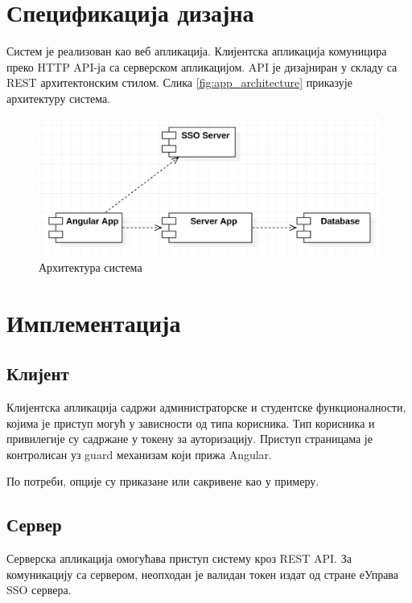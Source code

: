 \documentclass[a4paper]{article}
\begin{document}
\section*{Спецификација дизајна}

Систем је реализован као веб апликација. Клијентска апликација комуницира преко HTTP API-ја са серверском апликацијом. API је
дизајниран у складу са REST архитектонским стилом. Слика \autoref{fig:app_architecture} приказује архитектуру система.

\begin{figure}[H]
    \centering
    \includegraphics{images/app_architecture.png}
    \caption{Архитектура система}
    \label{fig:app_architecture}
\end{figure}

\section*{Имплементација}

\subsection*{Клијент}

Клијентска апликација садржи администраторске и студентске функционалности, којима је приступ могућ у зависности од
типа корисника. Тип корисника и привилегије су садржане у токену за ауторизацију. Приступ страницама је контролисан уз guard механизам који прижа Angular.

По потреби, опције су приказане или сакривене као у примеру.

\subsection*{Сервер}

Серверска апликација омогућава приступ систему кроз REST API. За комуникацију са сервером, неопходан је валидан токен издат од стране еУправа SSO сервера.
\end{document}
